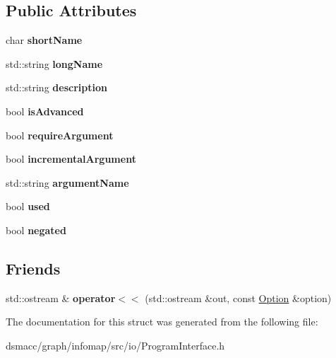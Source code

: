 \subsection*{Public Attributes}
\begin{DoxyCompactItemize}
\item 
\mbox{\label{structOption_a2d4208ca1b7f380da124d421d0edd4ac}} 
char {\bfseries short\+Name}
\item 
\mbox{\label{structOption_aa363ef44784c810db2725419c578dc3d}} 
std\+::string {\bfseries long\+Name}
\item 
\mbox{\label{structOption_a254f3009a726b0d5e6200b1daa4b163c}} 
std\+::string {\bfseries description}
\item 
\mbox{\label{structOption_a4c45fcbf5a4f36936ba222283a88c56e}} 
bool {\bfseries is\+Advanced}
\item 
\mbox{\label{structOption_a1871972e6e798444cb1f8650a9947277}} 
bool {\bfseries require\+Argument}
\item 
\mbox{\label{structOption_ad1c37765564e106dbb2775af3f634062}} 
bool {\bfseries incremental\+Argument}
\item 
\mbox{\label{structOption_a998c948d236ad4d77a4db6b55bdcc11b}} 
std\+::string {\bfseries argument\+Name}
\item 
\mbox{\label{structOption_a5d489d6f18c729f34b37608db593d70a}} 
bool {\bfseries used}
\item 
\mbox{\label{structOption_a663cf97b4e72fa357490272686642df0}} 
bool {\bfseries negated}
\end{DoxyCompactItemize}
\subsection*{Friends}
\begin{DoxyCompactItemize}
\item 
\mbox{\label{structOption_a69d35bb7c9177e97bdcf394ea274a995}} 
std\+::ostream \& {\bfseries operator$<$$<$} (std\+::ostream \&out, const \mbox{\hyperlink{structOption}{Option}} \&option)
\end{DoxyCompactItemize}


The documentation for this struct was generated from the following file\+:\begin{DoxyCompactItemize}
\item 
dsmacc/graph/infomap/src/io/Program\+Interface.\+h\end{DoxyCompactItemize}
